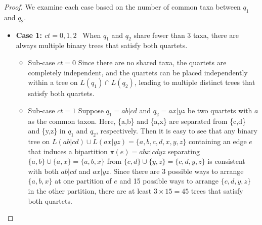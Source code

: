 \documentclass[runningheads]{llncs}
\newcommand{\add}[1]{{\color{blue} #1}}
\begin{document}
\begin{appendices}
\begin{proof}

We examine each case based on the number of common taxa between $q_1$ and $q_2$. %


\begin{itemize}
    \item \textbf{Case 1: $ct = 0, 1, 2$} \ When $q_1$ and $q_2$ share fewer than 3 taxa, there are always multiple binary trees that satisfy both quartets.



\begin{itemize}
    \item Sub-case $ct = 0$  Since there are no shared taxa, the quartets are completely independent, and the quartets can be placed independently within a tree on $L(q_1) \cap L(q_2)$, leading to multiple distinct trees that satisfy both quartets.

    \item Sub-case $ct = 1$ Suppose $q_1 = ab|cd$ and $q_2 = ax|yz$ be two quartets with $a$ as the common taxon. Here, \{a,b\} and \{a,x\} are separated from \{c,d\} and \{y,z\} in $q_1$ and $q_2$, respectively. Then it is easy to see that any binary tree on $L(ab|cd) \cup L(ax|yz) = \{a,b,c,d,x,y,z\}$ containing an edge $e$ that induces a bipartition $\pi(e) = abx|cdyz$ separating $\{a,b\} \cup \{a,x\} = \{a,b,x\}$ from $\{c,d\} \cup \{y,z\} = \{c,d,y,z\}$ is consistent with both $ab|cd$ and $ax|yz$. Since there are 3 possible ways to arrange $\{a,b,x\}$ at one partition of $e$ and 15 possible ways to arrange $\{c,d,y,z\}$ in the other partition, there are at least $3 \times 15 = 45$ trees that satisfy both quartets.


\end{itemize}
\end{itemize}
\end{proof}
\end{appendices}
\end{document}
